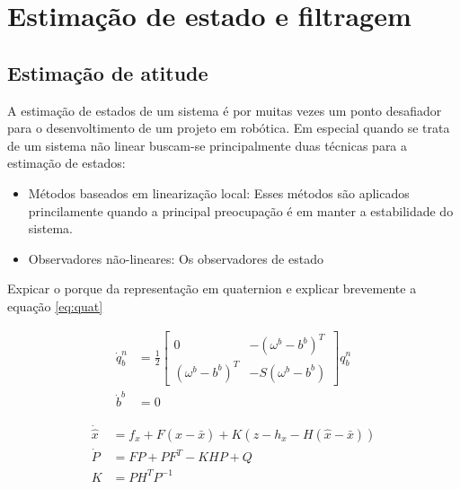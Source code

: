 \chapter{Estimação de estado e filtragem}

\section{Estimação de atitude}

A estimação de estados de um sistema é por muitas vezes um ponto desafiador para o desenvoltimento de um projeto em robótica. Em especial quando se trata de um sistema não linear buscam-se principalmente duas técnicas para a estimação de estados:
\begin{itemize}
    \item Métodos baseados em linearização local: Esses métodos são aplicados princilamente quando a principal preocupação é em manter a estabilidade do sistema. 


    \item Observadores não-lineares: Os observadores de estado 
    
\end{itemize}


Expicar o porque da representação em quaternion e explicar brevemente a equação \eqref{eq:quat}

\begin{equation}
\begin{aligned}
    \dot{q}_{b}^{n} &= \frac{1}{2} \begin{bmatrix} 0 & -(\omega^{b} - b^{b})^{T} \\ (\omega^{b} - b^{b})^{T} & -S(\omega^{b} - b^{b}) \end{bmatrix} q_{b}^{n} \\
    \dot{b}^{b} &= 0
\end{aligned}
\label{eq:quat}
\end{equation}



\begin{subequations}
\begin{align}
    \dot{\hat{x}} &= f_x + F(\hat{x} - \bar{x}) + K(z - h_x - H(\hat{x} - \bar{x})) \\
    \dot{P} &= FP + PF^{T} - KHP + Q \\
    K &= PH^{T}P^{-1}
\end{align}
\end{subequations}








